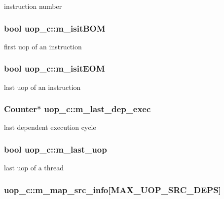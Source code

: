 \label{classuop__c_a8f764aaa37e8d6cf7f5a9ce54b796f88}
instruction number \hypertarget{classuop__c_a83a4be636c94d1cd0374d4d6c6cc6b73}{
\subsubsection[{m\_\-isitBOM}]{\setlength{\rightskip}{0pt plus 5cm}bool {\bf uop\_\-c::m\_\-isitBOM}}}
\label{classuop__c_a83a4be636c94d1cd0374d4d6c6cc6b73}
first uop of an instruction \hypertarget{classuop__c_af5a101ca6b34915c03d169aec29f74ee}{
\subsubsection[{m\_\-isitEOM}]{\setlength{\rightskip}{0pt plus 5cm}bool {\bf uop\_\-c::m\_\-isitEOM}}}
\label{classuop__c_af5a101ca6b34915c03d169aec29f74ee}
last uop of an instruction \hypertarget{classuop__c_a5c31eaec3d0421844ae67c8117e2e12d}{
\subsubsection[{m\_\-last\_\-dep\_\-exec}]{\setlength{\rightskip}{0pt plus 5cm}Counter$\ast$ {\bf uop\_\-c::m\_\-last\_\-dep\_\-exec}}}
\label{classuop__c_a5c31eaec3d0421844ae67c8117e2e12d}
last dependent execution cycle \hypertarget{classuop__c_a5b1259492da4298ae3db51c888a31659}{
\subsubsection[{m\_\-last\_\-uop}]{\setlength{\rightskip}{0pt plus 5cm}bool {\bf uop\_\-c::m\_\-last\_\-uop}}}
\label{classuop__c_a5b1259492da4298ae3db51c888a31659}
last uop of a thread \hypertarget{classuop__c_a2d59c4434f359dc0986e39d70c547024}{
\subsubsection[{m\_\-map\_\-src\_\-info}]{ {\bf uop\_\-c::m\_\-map\_\-src\_\-info}\mbox{[}MAX\_\-UOP\_\-SRC\_\-DEPS\mbox{]}}}

